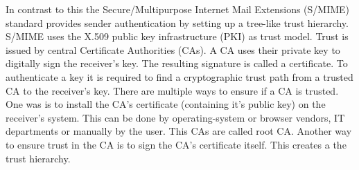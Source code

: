 In contrast to this the Secure/Multipurpose Internet Mail Extensions (S/MIME) standard provides sender authentication by setting up a tree-like trust hierarchy. S/MIME uses the X.509 public key infrastructure (PKI) as trust model. Trust is issued by central Certificate Authorities (CAs). A CA uses their private key to digitally sign the receiver's key. The resulting signature is called a certificate. To authenticate a key it is required to find a cryptographic trust path from a trusted CA to the receiver's key. There are multiple ways to ensure if a CA is trusted. One was is to install the CA's certificate (containing it's public key) on the receiver's system. This can be done by operating-system or browser vendors, IT departments or manually by the user. This CAs are called root CA. Another way to ensure trust in the CA is to sign the CA's certificate itself. This creates a the trust hierarchy. 

